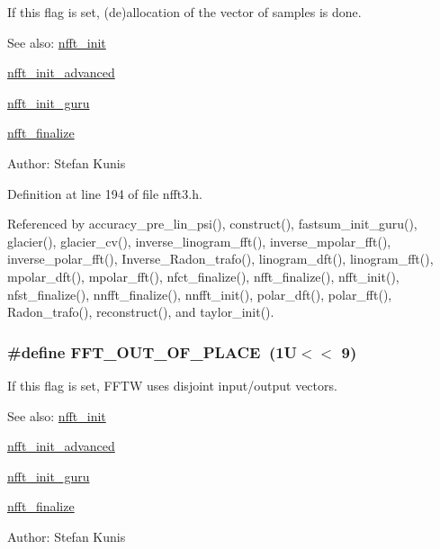 If this flag is set, (de)allocation of the vector of samples is done. 

\begin{Desc}
\item[See also:]\hyperlink{group__nfft_ga7}{nfft\_\-init} 

\hyperlink{group__nfft_ga8}{nfft\_\-init\_\-advanced} 

\hyperlink{group__nfft_ga9}{nfft\_\-init\_\-guru} 

\hyperlink{group__nfft_ga15}{nfft\_\-finalize} \end{Desc}
\begin{Desc}
\item[Author:]Stefan Kunis \end{Desc}


Definition at line 194 of file nfft3.h.

Referenced by accuracy\_\-pre\_\-lin\_\-psi(), construct(), fastsum\_\-init\_\-guru(), glacier(), glacier\_\-cv(), inverse\_\-linogram\_\-fft(), inverse\_\-mpolar\_\-fft(), inverse\_\-polar\_\-fft(), Inverse\_\-Radon\_\-trafo(), linogram\_\-dft(), linogram\_\-fft(), mpolar\_\-dft(), mpolar\_\-fft(), nfct\_\-finalize(), nfft\_\-finalize(), nfft\_\-init(), nfst\_\-finalize(), nnfft\_\-finalize(), nnfft\_\-init(), polar\_\-dft(), polar\_\-fft(), Radon\_\-trafo(), reconstruct(), and taylor\_\-init().\hypertarget{group__nfft_ga25}{
\subsubsection[FFT\_\-OUT\_\-OF\_\-PLACE]{\setlength{\rightskip}{0pt plus 5cm}\#define FFT\_\-OUT\_\-OF\_\-PLACE~(1U$<$$<$ 9)}}
\label{group__nfft_ga25}


If this flag is set, FFTW uses disjoint input/output vectors. 

\begin{Desc}
\item[See also:]\hyperlink{group__nfft_ga7}{nfft\_\-init} 

\hyperlink{group__nfft_ga8}{nfft\_\-init\_\-advanced} 

\hyperlink{group__nfft_ga9}{nfft\_\-init\_\-guru} 

\hyperlink{group__nfft_ga15}{nfft\_\-finalize} \end{Desc}
\begin{Desc}
\item[Author:]Stefan Kunis \end{Desc}


